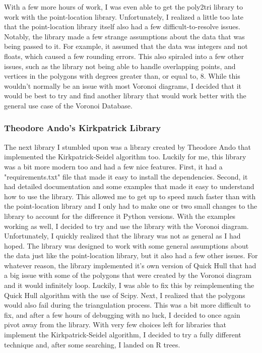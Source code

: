 \documentclass{article}
\begin{document}
\noindent
With a few more hours of work, I was even able to get the poly2tri library to work with the
point-location library. Unfortunately, I realized a little too late that the point-location
library itself also had a few difficult-to-resolve issues. Notably, the library made a few strange
assumptions about the data that was being passed to it. For example, it assumed that the data was
integers and not floats, which caused a few rounding errors. This also spiraled into a few other
issues, such as the library not being able to handle overlapping points, and vertices in the polygons
with degrees greater than, or equal to, 8. While this wouldn't normally be an issue with most Voronoi
diagrams, I decided that it would be best to try and find another library that would work better with
the general use case of the Voronoi Database.

\subsubsection{Theodore Ando's Kirkpatrick Library}
The next library I stumbled upon was a library created by Theodore Ando that implemented the Kirkpatrick-Seidel
algorithm too\cite{thedorekirkpatrick}. Luckily for me, this library was a bit more modern too and had a few nice features. First,
it had a "requirements.txt" file that made it easy to install the dependencies. Second, it had detailed documentation
and some examples that made it easy to understand how to use the library. This allowed me to get up to speed much faster
than with the point-location library and I only had to make one or two small changes to the library to account for the difference
it Python versions. With the examples working as well, I decided to try and use the library with the Voronoi diagram. Unfortunately,
I quickly realized that the library was not as general as I had hoped. The library was designed to work with some general 
assumptions about the data just like the point-location library, but it also had a few other issues. For whatever reason,
the library implemented it's own version of Quick Hull that had a big issue with some of the polygons that were created by the
Voronoi diagram and it would infinitely loop. Luckily, I was able to fix this by reimplementing the Quick Hull algorithm with
the use of Scipy. Next, I realized that the polygons would also fail during the triangulation process. This was a bit more
difficult to fix, and after a few hours of debugging with no luck, I decided to once again pivot away from the library. With
very few choices left for libraries that implement the Kirkpatrick-Seidel algorithm, I decided to try a fully different technique
and, after some searching, I landed on R trees. 
\end{document}
